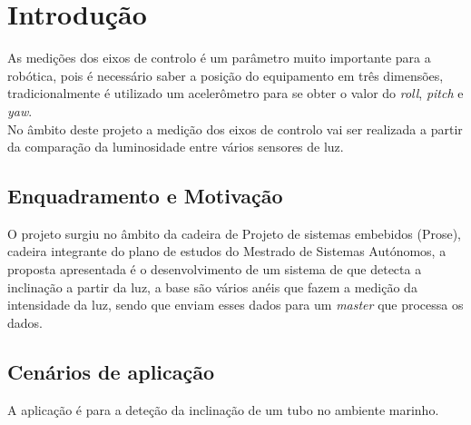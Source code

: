 

\chapter{Introdução}

As medições dos eixos de controlo é um parâmetro muito importante para a robótica, pois é necessário saber a posição do equipamento em três dimensões, tradicionalmente é utilizado um acelerômetro para se obter o valor do \textit{roll}, \textit{pitch} e \textit{yaw}.
\\ No âmbito deste projeto a medição dos eixos de controlo vai ser realizada a partir da comparação da luminosidade entre vários sensores de luz.

\section{Enquadramento e Motivação}
O projeto surgiu no âmbito da cadeira de Projeto de sistemas embebidos (Prose), cadeira integrante do plano de estudos do Mestrado de Sistemas Autónomos, a proposta apresentada é o desenvolvimento de um sistema de que detecta a inclinação a partir da luz, a base são vários anéis que fazem a medição da intensidade da luz, sendo que enviam esses dados para um \textit{master} que processa os dados.

\section{Cenários de aplicação}
A aplicação é para a deteção da inclinação de um tubo no ambiente marinho.

